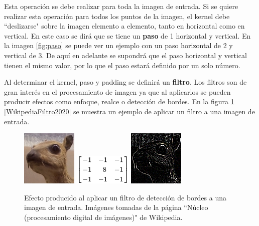 Esta operación se debe realizar para toda la imagen de entrada. Si se quiere realizar esta operación para todos los puntos de la imagen, el kernel debe ``deslizarse" sobre la imagen elemento a elemento, tanto en horizontal como en vertical. En este caso se dirá que se tiene un \textbf{paso} de 1 horizontal y vertical. En la imagen \ref{fig:paso} se puede ver un ejemplo con un paso horizontal de 2 y vertical de 3. De aquí en adelante se supondrá que el paso horizontal y vertical tienen el mismo valor, por lo que el paso estará definido por un solo número.


Al determinar el kernel, paso y padding se definirá un \textbf{filtro}. Los filtros son de gran interés en el procesamiento de imagen ya que al aplicarlos se pueden producir efectos como enfoque, realce o detección de bordes. En la figura \ref{fig:filtro} \ref{WikipediaFiltro2020} se muestra un ejemplo de aplicar un filtro a una imagen de entrada.

\begin{figure}[ht]
\centering
\includegraphics[scale=2]{img/filter_og.png}
\includegraphics[scale=1]{img/filter_edge_kernel.png}
\includegraphics[scale=2]{img/filter_edge.png}
\caption[Resultado de aplicar un filtro de reconocimiento de bordes a una imagen.]{Efecto producido al aplicar un filtro de detección de bordes a una imagen de entrada. Imágenes tomadas de la página ``Núcleo (procesamiento digital de imágenes)"\phantom{x} de Wikipedia.}\bigskip
\label{fig:filtro}
\end{figure}

